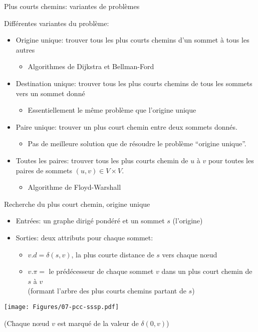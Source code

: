 \begin{frame}{Plus courts chemins: variantes de problèmes}

Différentes variantes du problème:
\begin{itemize}
\item \alert{Origine unique}: trouver tous les plus courts chemins d'un sommet à tous les autres
\begin{itemize}
\item Algorithmes de Dijkstra et Bellman-Ford
\end{itemize}
\item \alert{Destination unique}: trouver tous les plus courts chemins de tous les sommets vers un sommet donné
\begin{itemize}
\item Essentiellement le même problème que l'origine unique
\end{itemize}
\item \alert{Paire unique}: trouver un plus court chemin entre deux sommets donnés.
\begin{itemize}
\item Pas de meilleure solution que de résoudre le problème ``origine unique''.
\end{itemize}
\item \alert{Toutes les paires}: trouver tous les plus courts chemin de $u$ à
  $v$ pour toutes les paires de sommets $(u,v)\in V\times V$.
\begin{itemize}
\item Algorithme de Floyd-Warshall
\end{itemize}
\end{itemize}

\end{frame}



\begin{frame}{Recherche du plus court chemin, origine unique}

\begin{itemize}
\item Entrées: un graphe dirigé pondéré et un sommet $s$ (l'origine)
\item Sorties: deux attributs pour chaque sommet:
\begin{itemize}
\item $v.d=\delta(s,v)$, la plus courte distance de $s$ vers chaque n\oe ud
\item $v.\pi=$ le prédécesseur de chaque sommet $v$ dans un plus court chemin de $s$ à $v$\\
(formant \alert{l'arbre} des plus courts chemins partant de $s$)
\end{itemize}
\end{itemize}

\centerline{\texttt{[image: Figures/07-pcc-sssp.pdf]}}

\centerline{\small(Chaque n\oe ud $v$ est marqué de la valeur de $\delta(0,v)$)}

\end{frame}

